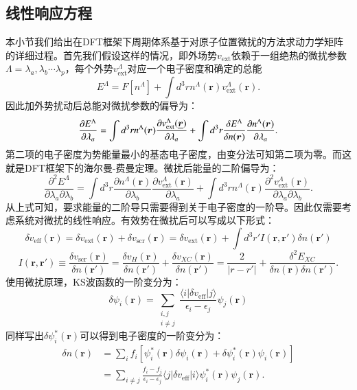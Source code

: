 \subsection{线性响应方程}
本小节我们给出在DFT框架下周期体系基于对原子位置微扰的方法求动力学矩阵的详细过程。首先我们假设这样的情况，即外场势$v_{\mathrm{ext}}$依赖于一组绝热的微扰参数$\Lambda={\lambda_a,\lambda_b \cdots \lambda_p}$，每个外势$v_{\mathrm{ext}}^\Lambda$对应一个电子密度和确定的总能
\begin{equation}
  E^\Lambda = F[n^\Lambda]+\int d^3 r n^\Lambda (\bm{r})v_\mathrm{ext}^\Lambda (\bm{r}).
\end{equation}
因此加外势扰动后总能对微扰参数的偏导为：
\begin{equation}
  \frac{\partial E^\Lambda}{\partial \lambda_a} =
  \int d^3 r n^\Lambda(\bm{r})\frac{\partial v^\Lambda_\mathrm{ext}(\underline{\bm{r}})}{\partial \lambda_a} +
  \int d^3 r \frac{\delta E^\Lambda}{\delta n(\bm{r})} \frac{\partial n^\Lambda(\bm{r})}{\partial \lambda_a}.
\end{equation}
第二项的电子密度为势能量最小的基态电子密度，由变分法可知第二项为零。而这就是DFT框架下的海尔曼-费曼定理\cite{feynman1939forces}。微扰后能量的二阶偏导为：
\begin{equation}\label{eq:second_order_energy}
  \frac{\partial^2 E^\Lambda}{\partial\lambda_a\partial\lambda_b} =
  \int d^3 r\frac{\partial n^\Lambda(\bm{r})}{\partial\lambda_b}\frac{\partial v^\Lambda_\mathrm{ext}(\bm{r})}{\partial\lambda_a} +
  \int d^3 r n^\Lambda(\bm{r})\frac{\partial^2 v^\Lambda_\mathrm{ext}(\bm{r})}{\partial\lambda_a\partial\lambda_b}.
\end{equation}
从上式可知，要求能量的二阶导只需要得到关于电子密度的一阶导。因此仅需要考虑系统对微扰的线性响应。有效势在微扰后可以写成以下形式：
\begin{equation}\label{eq:linear_variation}
  \delta v_{\mathrm{eff}}(\bm{r}) = \delta v_\mathrm{ext}(\bm{r}) + \delta v_\mathrm{scr}(\bm{r}) =
  \delta v_\mathrm{ext}(\bm{r}) + \int d^3 r' I(\bm{r},\bm{r'})\delta n(\bm{r'})
\end{equation}
\begin{equation}
  I(\bm{r},\bm{r'}) \equiv \frac{\delta v_\mathrm{scr}(\bm{r})}{\delta n(\bm{r'})} = \frac{\delta v_H(\bm{r})}{\delta n(\bm{r'})} +
  \frac{\delta v_{XC}(\bm{r})}{\delta n(\bm{r'})} =
  \frac{2}{|r-r'|} + \frac{\delta^2 E_{XC}}{\delta n(\bm{r}) \delta n(\bm{r'})}.
\end{equation}
使用微扰原理，KS波函数的一阶变分为：
\begin{equation}
  \delta \psi_i(\bm{r}) = \sum_{\substack{i,j\\i\neq j}} \frac{\langle i |\delta v_{\mathrm{eff}}|j \rangle}{\epsilon_i-\epsilon_j} \psi_j(\bm{r})
\end{equation}
同样写出$\delta \psi_i^*(\bm{r})$可以得到电子密度的一阶变分为：
\begin{align}\label{eq:linear_variation_ele}
  \delta n(\bm{r}) &= \sum_i f_i [\psi_i^*(\bm{r})\delta \psi_i(\bm{r}) + \delta \psi_i^*(\bm{r}) \psi_i(\bm{r})] \\
  &= \sum_{i\neq j} \frac{f_i-f_j}{\epsilon_i-\epsilon_j} \langle j| \delta v_\mathrm{eff} | i \rangle \psi_i^*(\bm{r}) \psi_j(\bm{r}).
\end{align}


